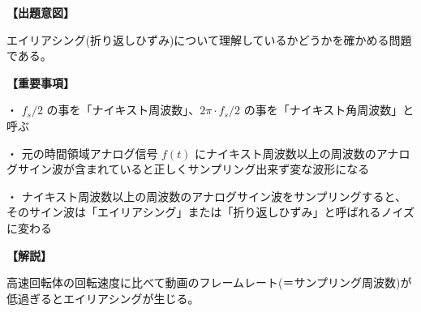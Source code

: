\noindent \textbf{【出題意図】}

\noindent エイリアシング(折り返しひずみ)について理解しているかどうかを確かめる問題である。

\vspace{1em}
\noindent \textbf{【重要事項】}

\medskip
\noindent ・ $f_s/2$ の事を「ナイキスト周波数」、$2\pi \cdot f_s/2$ の事を「ナイキスト角周波数」と呼ぶ

\medskip
\noindent ・ 元の時間領域アナログ信号 $f(t)$ にナイキスト周波数以上の周波数のアナログサイン波が含まれていると正しくサンプリング出来ず変な波形になる

\medskip
\noindent ・ ナイキスト周波数以上の周波数のアナログサイン波をサンプリングすると、そのサイン波は「エイリアシング」または「折り返しひずみ」と呼ばれるノイズに変わる

\vspace{1em}
\noindent \textbf{【解説】}

\noindent  高速回転体の回転速度に比べて動画のフレームレート(＝サンプリング周波数)が低過ぎるとエイリアシングが生じる。
